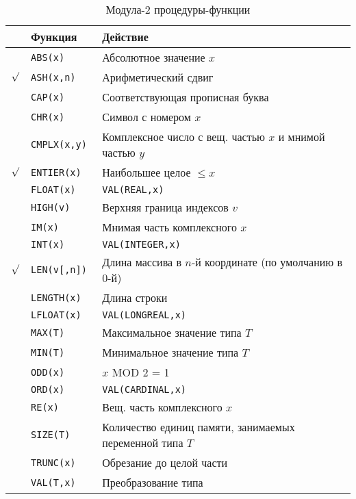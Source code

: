 \begin{table}[htb]
\begin{center}
\begin{tabular}{|cl|p{7.5cm}|} \hline
&\bf Функция  &\bf Действие \\ \hline
&\tt ABS(x)   & Абсолютное значение $x$ \\              \index{ABS}
$\surd$&\tt ASH(x,n) & Арифметический сдвиг \\              \index{ASH}
&\tt CAP(x)   & Соответствующая прописная буква \\  \index{CAP}
&\tt CHR(x)   & Символ с номером $x$ \\  \index{CHR}
&\tt CMPLX(x,y) & Комплексное число с вещ. частью $x$
                  и мнимой частью $y$           \\ \index{CMPLX}
$\surd$&\tt ENTIER(x) & Наибольшее целое $\leq x$ \\ \index{ENTIER}
&\tt FLOAT(x) &\tt  VAL(REAL,x) \\                     \index{FLOAT}
&\tt HIGH(v)  & Верхняя граница индексов $v$  \\    \index{HIGH}
&\tt IM(x)    & Мнимая часть комплексного $x$ \\         \index{IM}
&\tt INT(x)   &\tt VAL(INTEGER,x)          \\         \index{INT}
$\surd$&\tt LEN(v[,n]) & Длина массива
           в $n$-й координате (по умолчанию в 0-й) \\    \index{LEN}
&\tt LENGTH(x) & Длина строки \\         \index{LENGTH}
&\tt LFLOAT(x) &\tt VAL(LONGREAL,x) \\                 \index{LFLOAT}
&\tt MAX(T)   &  Максимальное значение типа $T$ \\         \index{MAX}
&\tt MIN(T)   &  Минимальное значение типа $T$ \\         \index{MIN}
&\tt ODD(x)   & $x$ MOD 2 = 1 \\                      \index{ODD}
&\tt ORD(x)   &\tt VAL(CARDINAL,x)    \\               \index{ORD (M2)}
&\tt RE(x)    & Вещ. часть комплексного $x$ \\         \index{RE}
&\tt SIZE(T)  & Количество единиц памяти, занимаемых переменной
                типа $T$  \\ \index{SIZE}
&\tt TRUNC(x) & Обрезание до целой части      \\ \index{TRUNC}
&\tt VAL(T,x) & Преобразование типа            \index{VAL (M2)}
\\ \hline
\end{tabular}
\end{center}
\caption{Модула-2 процедуры-функции}\label{table:m2:stdfunc}
\end{table}


